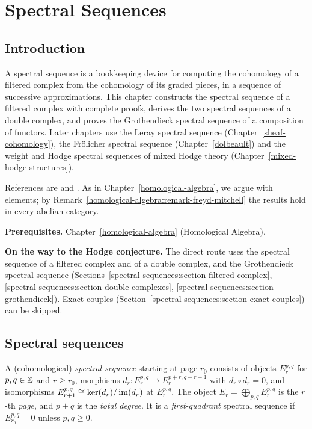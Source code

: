 \chapter{Spectral Sequences}\label{spectral-sequences}

\section{Introduction}\label{spectral-sequences:section-introduction}

A spectral sequence is a bookkeeping device for computing the cohomology of a filtered complex from the
cohomology of its graded pieces, in a sequence of successive approximations. This chapter constructs the
spectral sequence of a filtered complex with complete proofs, derives the two spectral sequences of a double
complex, and proves the Grothendieck spectral sequence of a composition of functors. Later chapters use the
Leray spectral sequence (Chapter~\ref{sheaf-cohomology}), the Fr\"olicher spectral sequence
(Chapter~\ref{dolbeault}) and the weight and Hodge spectral sequences of mixed Hodge theory
(Chapter~\ref{mixed-hodge-structures}).

References are \cite[Chapter 5]{weibel-homological} and \cite{mccleary-users-guide}. As in
Chapter~\ref{homological-algebra}, we argue with elements; by
Remark~\ref{homological-algebra:remark-freyd-mitchell} the results hold in every abelian category.

\noindent\textbf{Prerequisites.} Chapter~\ref{homological-algebra} (Homological Algebra).

\noindent\textbf{On the way to the Hodge conjecture.} The direct route uses the spectral sequence of a filtered complex and of a double complex, and the Grothendieck spectral sequence
(Sections~\ref{spectral-sequences:section-filtered-complex}, \ref{spectral-sequences:section-double-complexes}, \ref{spectral-sequences:section-grothendieck}). Exact couples (Section~\ref{spectral-sequences:section-exact-couples}) can be skipped.

\section{Spectral sequences}\label{spectral-sequences:section-definitions}

\begin{definition}\label{spectral-sequences:definition-spectral-sequence}
A (cohomological) \emph{spectral sequence} starting at page $r_0$ consists of objects $E_r^{p,q}$ for $p, q \in \mathbb{Z}$
and $r \geq r_0$, morphisms $d_r \colon E_r^{p,q} \to E_r^{p+r, q-r+1}$ with $d_r \circ d_r = 0$, and isomorphisms
$E_{r+1}^{p,q} \cong \ker(d_r)/\operatorname{im}(d_r)$ at $E_r^{p,q}$. The object $E_r = \bigoplus_{p,q}E_r^{p,q}$ is the $r$-th \emph{page}, and
$p + q$ is the \emph{total degree}. It is a \emph{first-quadrant} spectral sequence if $E_{r_0}^{p,q} = 0$ unless $p, q \geq 0$.
\end{definition}

